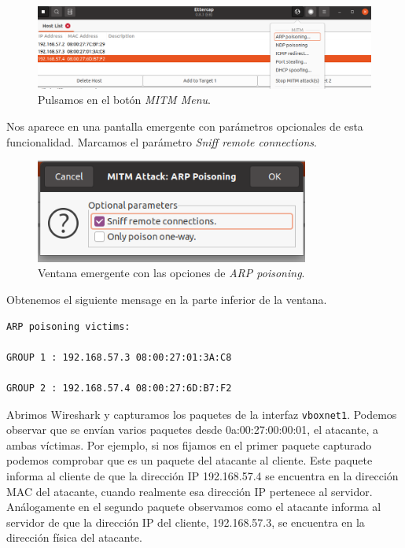\documentclass[11pt]{article}
\begin{document}
\begin{figure}[H]
	\centering
	\includegraphics[width=140mm]{images/ettercap-mitm-arp-poisoning}
	\caption{Pulsamos en el botón \textit{MITM Menu}.}
	\label{fig:host-list}
\end{figure}

Nos aparece en una pantalla emergente con parámetros opcionales de esta funcionalidad. Marcamos el parámetro \textit{Sniff remote connections}.

\begin{figure}[H]
	\centering
	\includegraphics[width=90mm]{images/ettercap-arp-poisoning}
	\caption{Ventana emergente con las opciones de \textit{ARP poisoning}.}
	\label{fig:host-list}
\end{figure}

Obtenemos el siguiente mensage en la parte inferior de la ventana.

\begin{Verbatim}[tabsize=4]
ARP poisoning victims:

GROUP 1 : 192.168.57.3 08:00:27:01:3A:C8

GROUP 2 : 192.168.57.4 08:00:27:6D:B7:F2
\end{Verbatim}

Abrimos Wireshark y capturamos los paquetes de la interfaz \texttt{vboxnet1}. Podemos observar que se envían varios paquetes desde 0a:00:27:00:00:01, el atacante, a ambas víctimas. Por ejemplo, si nos fijamos en el primer paquete capturado podemos comprobar que es un paquete del atacante al cliente. Este paquete informa al cliente de que la dirección IP 192.168.57.4 se encuentra en la dirección MAC del atacante, cuando realmente esa dirección IP pertenece al servidor. Análogamente en el segundo paquete observamos como el atacante informa al servidor de que la dirección IP del cliente, 192.168.57.3, se encuentra en la dirección física del atacante.
\end{document}
